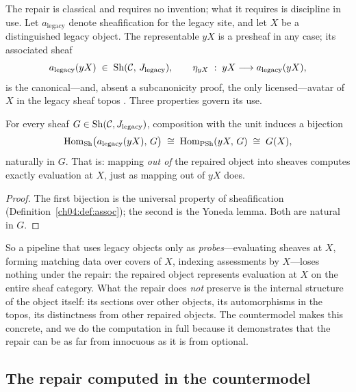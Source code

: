 The repair is classical and requires no invention; what it requires is
discipline in use. Let $a_{\mathrm{legacy}}$ denote sheafification for the
legacy site, and let $X$ be a distinguished legacy object. The
representable $yX$ is a presheaf in any case; its associated sheaf
\[
a_{\mathrm{legacy}}(yX)\;\in\;\mathrm{Sh}(\mathcal{C},\,J_{\mathrm{legacy}}),
\qquad
\eta_{yX}\;:\;yX\longrightarrow a_{\mathrm{legacy}}(yX),
\]
is the canonical---and, absent a subcanonicity proof, the only
licensed---avatar of $X$ in the legacy sheaf topos \cite{stacks00WO}. Three
properties govern its use.

\begin{proposition}\label{ch06:prop:preserves}
For every sheaf $G\in\mathrm{Sh}(\mathcal{C},J_{\mathrm{legacy}})$, composition with the
unit induces a bijection
\[
\mathrm{Hom}_{\mathrm{Sh}}\bigl(a_{\mathrm{legacy}}(yX),\,G\bigr)
\;\cong\;
\mathrm{Hom}_{\mathrm{PSh}}(yX,\,G)
\;\cong\;
G(X),
\]
naturally in $G$. That is: mapping \emph{out of} the repaired object into
sheaves computes exactly evaluation at $X$, just as mapping out of $yX$
does.
\end{proposition}

\begin{proof}
The first bijection is the universal property of sheafification
(Definition~\ref{ch04:def:assoc}); the second is the Yoneda lemma. Both are
natural in $G$.
\end{proof}

So a pipeline that uses legacy objects only as \emph{probes}---evaluating
sheaves at $X$, forming matching data over covers of $X$, indexing
assessments by $X$---loses nothing under the repair: the repaired object
represents evaluation at $X$ on the entire sheaf category. What the repair
does \emph{not} preserve is the internal structure of the object itself:
its sections over other objects, its automorphisms in the topos, its
distinctness from other repaired objects. The countermodel makes this
concrete, and we do the computation in full because it
demonstrates that the repair can be as far from innocuous as it is from
optional.

\subsection{The repair computed in the countermodel}
\label{ch06:sec:repaircomputed}

